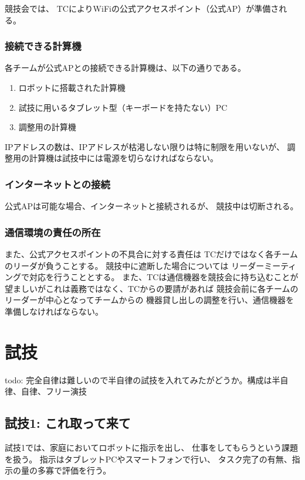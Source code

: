 \documentclass[a4j]{jarticle}
\begin{document}
競技会では、
TCによりWiFiの公式アクセスポイント（公式AP）が準備される。

\subsubsection{接続できる計算機}

各チームが公式APとの接続できる計算機は、以下の通りである。

\begin{enumerate}
	\item ロボットに搭載された計算機
	\item 試技に用いるタブレット型（キーボードを持たない）PC
	\item 調整用の計算機
\end{enumerate}
IPアドレスの数は、IPアドレスが枯渇しない限りは特に制限を用いないが、
調整用の計算機は試技中には電源を切らなければならない。


\subsubsection{インターネットとの接続}

公式APは可能な場合、インターネットと接続されるが、
競技中は切断される。

\subsubsection{通信環境の責任の所在}

また、公式アクセスポイントの不具合に対する責任は
TCだけではなく各チームのリーダが負うことする。
競技中に遮断した場合については
リーダーミーティングで対応を行うこととする。
また、TCは通信機器を競技会に持ち込むことが
望ましいがこれは義務ではなく、TCからの要請があれば
競技会前に各チームのリーダーが中心となってチームからの
機器貸し出しの調整を行い、通信機器を準備しなければならない。


\section{試技}

todo: 完全自律は難しいので半自律の試技を入れてみたがどうか。構成は半自律、自律、フリー演技

\subsection{試技1: これ取って来て}

試技1では、家庭においてロボットに指示を出し、
仕事をしてもらうという課題を扱う。
指示はタブレットPCやスマートフォンで行い、
タスク完了の有無、指示の量の多寡で評価を行う。
\end{document}
